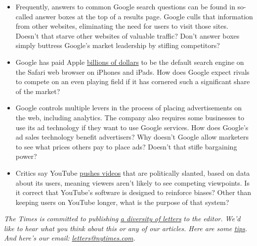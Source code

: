 \begin{itemize}
\tightlist
\item
  Frequently, answers to common Google search questions can be found in
  so-called answer boxes at the top of a results page. Google culls that
  information from other websites, eliminating the need for users to
  visit those sites. Doesn't that starve other websites of valuable
  traffic? Don't answer boxes simply buttress Google's market leadership
  by stifling competitors?
\end{itemize}

\begin{itemize}
\tightlist
\item
  Google has paid Apple
  \href{https://www.theverge.com/2020/7/1/21310591/apple-google-search-engine-safari-iphone-deal-billions-regulation-antitrust}{billions
  of dollars} to be the default search engine on the Safari web browser
  on iPhones and iPads. How does Google expect rivals to compete on an
  even playing field if it has cornered such a significant share of the
  market?
\end{itemize}

\begin{itemize}
\tightlist
\item
  Google controls multiple levers in the process of placing
  advertisements on the web, including analytics. The company also
  requires some businesses to use its ad technology if they want to use
  Google services. How does Google's ad sales technology benefit
  advertisers? Why doesn't Google allow marketers to see what prices
  others pay to place ads? Doesn't that stifle bargaining power?
\end{itemize}

\begin{itemize}
\tightlist
\item
  Critics say YouTube
  \href{https://www.nytimes.com/2020/07/13/technology/google-ads-antitrust.html}{pushes
  videos} that are politically slanted, based on data about its users,
  meaning viewers aren't likely to see competing viewpoints. Is it
  correct that YouTube's software is designed to reinforce biases? Other
  than keeping users on YouTube longer, what is the purpose of that
  system?
\end{itemize}

\emph{The Times is committed to publishing}
\href{https://www.nytimes.com/2019/01/31/opinion/letters/letters-to-editor-new-york-times-women.html}{\emph{a
diversity of letters}} \emph{to the editor. We'd like to hear what you
think about this or any of our articles. Here are some}
\href{https://help.nytimes.com/hc/en-us/articles/115014925288-How-to-submit-a-letter-to-the-editor}{\emph{tips}}\emph{.
And here's our email:}
\href{mailto:letters@nytimes.com}{\emph{letters@nytimes.com}}\emph{.}

